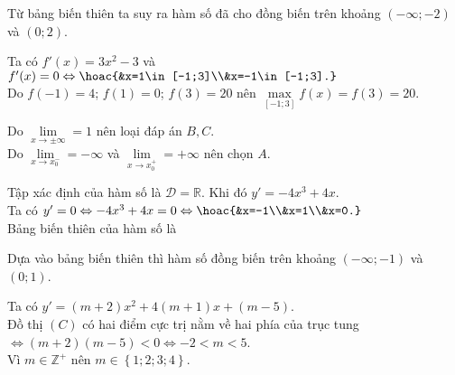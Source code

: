 \begin{Solbook}{5}
 \par \noindent  Từ bảng biến thiên ta suy ra hàm số đã cho đồng biến trên khoảng $(-\infty ;-2)$ và $(0;2)$.  \par \noindent \selectD \hfill \qedEX 
\end{Solbook}
\begin{Solbook}{6}
 \par \noindent  Ta có $f'(x)=3x^2-3$ và $f'(x)=0\Leftrightarrow \hoac {&x=1\in [-1;3]\\&x=-1\in [-1;3].}$\\ Do $f(-1)=4$; $f(1)=0$; $f(3)=20$ nên $\max \limits _{[-1;3]} f(x)=f(3)=20$. \par \noindent \selectA \hfill \qedEX 
\end{Solbook}
\begin{Solbook}{7}
 \par \noindent Do $\lim \limits _{x \to \pm \infty } =1$ nên loại đáp án $B, C$.\\ Do $\lim \limits _{x \to x_0^-} = -\infty $ và $\lim \limits _{x \to x_0^+} = +\infty $ nên chọn $A$.  \par \noindent \selectD \hfill \qedEX 
\end{Solbook}
\begin{Solbook}{8}
 \par \noindent  Tập xác định của hàm số là $\mathscr D = \mathbb {R}$. Khi đó $y' = -4x^3 + 4x$.\\ Ta có $y' = 0 \Leftrightarrow -4x^3 + 4x = 0 \Leftrightarrow \hoac {&x=-1\\&x=1\\&x=0.}$\\ Bảng biến thiên của hàm số là \begin {center}  \end {center} Dựa vào bảng biến thiên thì hàm số đồng biến trên khoảng $(-\infty ; -1)$ và $(0;1)$.  \par \noindent \selectA \hfill \qedEX 
\end{Solbook}
\begin{Solbook}{9}
 \par \noindent  Ta có $ y' = (m + 2)x^2 + 4(m + 1)x + (m - 5) $.\\ Đồ thị $ (C) $ có hai điểm cực trị nằm về hai phía của trục tung $ \Leftrightarrow (m + 2)( m - 5) < 0 \Leftrightarrow - 2 < m < 5 $.\\ Vì $ m \in \mathbb {Z}^+ $ nên $ m \in \left \{ 1; 2; 3; 4 \right \} $.  \par \noindent \selectA \hfill \qedEX 
\end{Solbook}
